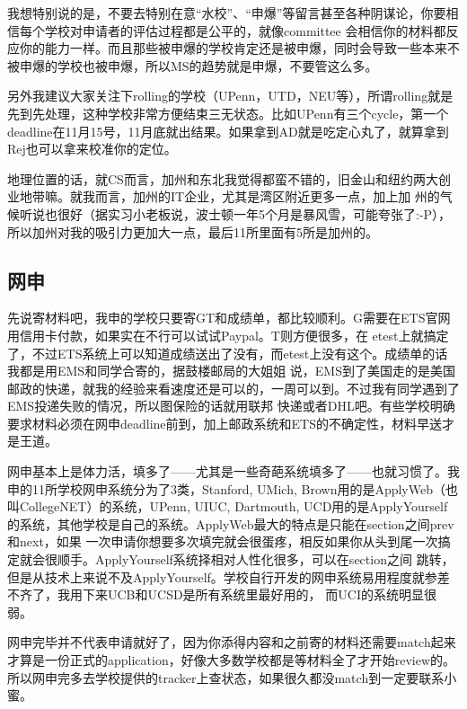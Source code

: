 我想特别说的是，不要去特别在意“水校”、“申爆”等留言甚至各种阴谋论，你要相信每个学校对申请者的评估过程都是公平的，就像committee 会相信你的材料都反应你的能力一样。而且那些被申爆的学校肯定还是被申爆，同时会导致一些本来不被申爆的学校也被申爆，所以MS的趋势就是申爆，不要管这么多。\par

另外我建议大家关注下rolling的学校（UPenn，UTD，NEU等），所谓rolling就是先到先处理，这种学校非常方便结束三无状态。比如UPenn有三个cycle，第一个deadline在11月15号，11月底就出结果。如果拿到AD就是吃定心丸了，就算拿到Rej也可以拿来校准你的定位。\par

地理位置的话，就CS而言，加州和东北我觉得都蛮不错的，旧金山和纽约两大创业地带嘛。就我而言，加州的IT企业，尤其是湾区附近更多一点，加上加 州的气候听说也很好（据实习小老板说，波士顿一年5个月是暴风雪，可能夸张了:-P），所以加州对我的吸引力更加大一点，最后11所里面有5所是加州的。\par

\subsection{网申}

先说寄材料吧，我申的学校只要寄GT和成绩单，都比较顺利。G需要在ETS官网用信用卡付款，如果实在不行可以试试Paypal。T则方便很多，在 etest上就搞定了，不过ETS系统上可以知道成绩送出了没有，而etest上没有这个。成绩单的话我都是用EMS和同学合寄的，据鼓楼邮局的大姐姐 说，EMS到了美国走的是美国邮政的快递，就我的经验来看速度还是可以的，一周可以到。不过我有同学遇到了EMS投递失败的情况，所以图保险的话就用联邦 快递或者DHL吧。有些学校明确要求材料必须在网申deadline前到，加上邮政系统和ETS的不确定性，材料早送才是王道。\par

网申基本上是体力活，填多了——尤其是一些奇葩系统填多了——也就习惯了。我申的11所学校网申系统分为了3类，Stanford, UMich, Brown用的是ApplyWeb（也叫CollegeNET）的系统，UPenn, UIUC, Dartmouth, UCD用的是ApplyYourself的系统，其他学校是自己的系统。ApplyWeb最大的特点是只能在section之间prev和next，如果 一次申请你想要多次填完就会很蛋疼，相反如果你从头到尾一次搞定就会很顺手。ApplyYourself系统择相对人性化很多，可以在section之间 跳转，但是从技术上来说不及ApplyYourself。学校自行开发的网申系统易用程度就参差不齐了，我用下来UCB和UCSD是所有系统里最好用的， 而UCI的系统明显很弱。\par

网申完毕并不代表申请就好了，因为你添得内容和之前寄的材料还需要match起来才算是一份正式的application，好像大多数学校都是等材料全了才开始review的。所以网申完多去学校提供的tracker上查状态，如果很久都没match到一定要联系小蜜。\par


